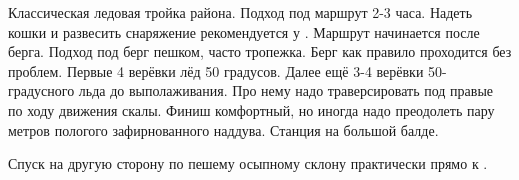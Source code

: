 Классическая ледовая тройка района. Подход под маршрут 2-3 часа.
Надеть кошки и развесить снаряжение рекомендуется у
. Маршрут
начинается после берга. Подход под берг пешком, часто тропежка. Берг
как правило проходится без проблем. Первые 4 верёвки лёд 50 градусов.
 Далее ещё 3-4 верёвки 50-градусного льда до
выполаживания. Про нему надо траверсировать под правые по ходу
движения скалы. Финиш комфортный, но иногда надо преодолеть пару
метров пологого зафирнованного наддува. Станция на большой балде.

Спуск на другую сторону по пешему осыпному склону практически прямо к
.

